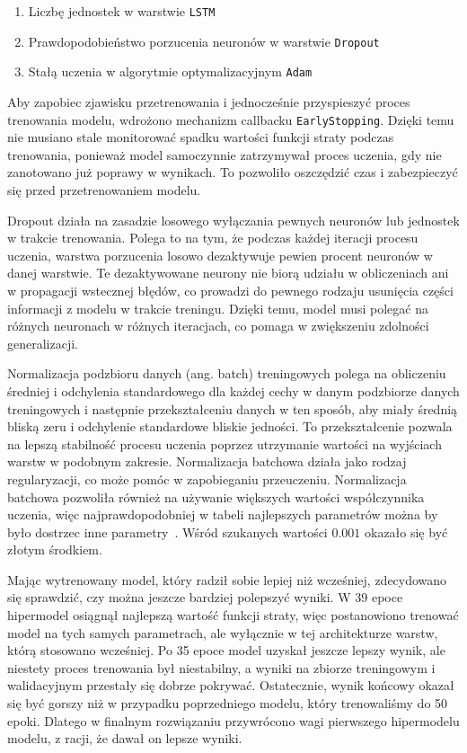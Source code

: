 \begin{enumerate}
    \item Liczbę jednostek w warstwie \texttt{LSTM}
    \item Prawdopodobieństwo porzucenia neuronów w warstwie \texttt{Dropout}
    \item Stałą uczenia w algorytmie optymalizacyjnym \texttt{Adam}
\end{enumerate}

Aby zapobiec zjawisku przetrenowania i jednocześnie przyspieszyć proces trenowania modelu, wdrożono mechanizm callbacku \texttt{EarlyStopping}. Dzięki temu nie musiano stale monitorować spadku wartości funkcji straty podczas trenowania, ponieważ model samoczynnie zatrzymywał proces uczenia, gdy nie zanotowano już poprawy w wynikach. To pozwoliło oszczędzić czas i zabezpieczyć się przed przetrenowaniem modelu.

Dropout działa na zasadzie losowego wyłączania pewnych neuronów lub jednostek w trakcie trenowania. Polega to na tym, że podczas każdej iteracji procesu uczenia, warstwa porzucenia losowo dezaktywuje pewien procent neuronów w danej warstwie. Te dezaktywowane neurony nie biorą udziału w obliczeniach ani w propagacji wstecznej błędów, co prowadzi do pewnego rodzaju usunięcia części informacji z modelu w trakcie treningu. Dzięki temu, model musi polegać na różnych neuronach w różnych iteracjach, co pomaga w zwiększeniu zdolności generalizacji.

Normalizacja podzbioru danych (ang. batch) treningowych polega na obliczeniu średniej i odchylenia standardowego dla każdej cechy w danym podzbiorze danych treningowych i następnie przekształceniu danych w ten sposób, aby miały średnią bliską zeru i odchylenie standardowe bliskie jedności. To przekształcenie pozwala na lepszą stabilność procesu uczenia poprzez utrzymanie wartości na wyjściach warstw w podobnym zakresie. Normalizacja batchowa działa jako rodzaj regularyzacji, co może pomóc w zapobieganiu przeuczeniu. Normalizacja batchowa pozwoliła również na używanie większych wartości współczynnika uczenia, więc najprawdopodobniej w tabeli najlepszych parametrów można by było dostrzec inne parametry~\cite{ioffe2015}. Wśród szukanych wartości $0.001$ okazało się być złotym środkiem.

Mając wytrenowany model, który radził sobie lepiej niż wcześniej, zdecydowano się sprawdzić, czy można jeszcze bardziej polepszyć wyniki. W 39 epoce hipermodel osiągnął najlepszą wartość funkcji straty, więc postanowiono trenować model na tych samych parametrach, ale wyłącznie w tej architekturze warstw, którą stosowano wcześniej. Po 35 epoce model uzyskał jeszcze lepszy wynik, ale niestety proces trenowania był niestabilny, a wyniki na zbiorze treningowym i walidacyjnym przestały się dobrze pokrywać. Ostatecznie, wynik końcowy okazał się być gorszy niż w przypadku poprzedniego modelu, który trenowaliśmy do 50 epoki. Dlatego w finalnym rozwiązaniu przywrócono wagi pierwszego hipermodelu modelu, z racji, że dawał on lepsze wyniki.

